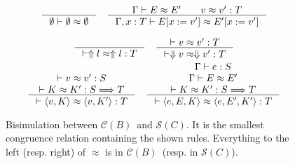 \documentclass[runningheads]{llncs}
\newcommand{\infr}[2]{\inference{#1}{#2}}
\newcommand{\CMachine}[1]{\ensuremath{\mathcal{C}(#1)}}
\newcommand{\CBMachine}[0]{\CMachine{B}}
\newcommand{\SMachine}[1]{\ensuremath{\mathcal{S}(#1)}}
\newcommand{\error}[1]{\ensuremath{\Uparrow#1}}
\newcommand{\ecast}[2]{\ensuremath{#1 : #2}}
\newcommand{\ccast}[3]{#1 \xRightarrow[]{\enskip #2 \enskip} #3}
\newcommand{\sexpr}[3]{\ensuremath{\langle#1,#2,#3\rangle}}
\newcommand{\scont}[2]{\ensuremath{\langle#1,#2\rangle}}
\newcommand{\shalt}[1]{\ensuremath{\Downarrow #1}}
\newcommand{\Kcons}[2]{[#1]#2}
\newcommand{\Fcast}[1]{\ecast{\square}{#1}}
\newcommand{\compose}[2]{\ensuremath{#1 \fatsemi #2}}
\newcommand{\translate}[1]{\ensuremath{\lceil#1\rceil}}
\newcommand{\expressiontyping}[3]{\ensuremath{#1 \vdash #2 : #3}}
\newcommand{\valuetyping}[2]{\ensuremath{\vdash #1 : #2}}
\newcommand{\casttyping}[3]{\ensuremath{\vdash #1 : #2 \Longrightarrow #3}}
\newcommand{\bisimE}[3]{\ensuremath{#1 \vdash #2 \approx #3}}
\newcommand{\bisimv}[3]{\valuetyping{#1 \approx #2}{#3}}
\newcommand{\bisimc}[4]{\casttyping{#1 \approx #2}{#3}{#4}}
\newcommand{\bisimK}[4]{\casttyping{#1 \approx #2}{#3}{#4}}
\newcommand{\bisims}[3]{\valuetyping{\ensuremath{#1 \approx #2}}{#3}}
\begin{document}
\begin{figure}
\fbox{\bisimE{\Gamma}{E}{E}}
\begin{gather*}
\inference{
}{
	\bisimE{\emptyset}{\emptyset}{\emptyset}
}
\quad
\inference{
	\Gamma \vdash E \approx E' \qquad
	v \approx v' : T
}{
	\Gamma , x : T \vdash 
	E [ x := v' ] \approx E' [ x := v' ]
}
\end{gather*}

\fbox{\bisims{s}{s}{T}}
\begin{gather*}
\infr{}{\bisims{\error{l}}{\error{l}}{T}} \quad
\infr{
	\bisimv{v}{v'}{T}
}{
	\bisims{\shalt{v}}{\shalt{v'}}{T}
}
\\
\infr{
	\bisimv{v}{v'}{S} \\
	\bisimK{K}{K'}{S}{T}
}{
	\bisims{\scont{v}{K}}{\scont{v}{K'}}{T}
} \quad
\infr{
	\expressiontyping{\Gamma}{e}{S} \\
	\bisimE{\Gamma}{E}{E'}          \\
	\bisimK{K}{K'}{S}{T}
}{
	\bisims{\sexpr{e}{E}{K}}{\sexpr{e}{E'}{K'}}{T}
}
\end{gather*}

\caption{Bisimulation between \CBMachine\ and \SMachine{C}. It is the smallest 
congruence relation containing the shown rules. Everything to the left (resp. 
right) of $\approx$ is in \CBMachine\ (resp. in \SMachine{C}).}
\label{fig:bisim-SC-D}
\end{figure}



\end{document}
